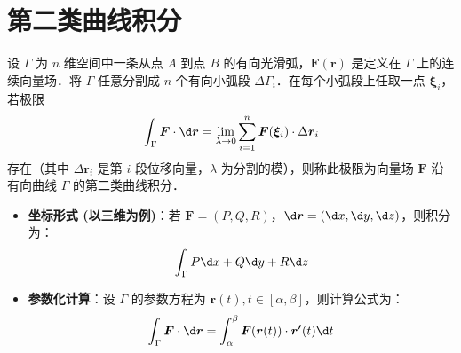 \documentclass[12pt, a4paper, oneside, UTF8]{ctexbook}
\begin{document}
\section{第二类曲线积分}
\begin{definition}[第二类曲线积分的定义]
    设 $\Gamma$ 为 $n$ 维空间中一条从点 $A$ 到点 $B$ 的有向光滑弧，$\bm{F}(\bm{r})$ 是定义在 $\Gamma$ 上的连续向量场．将 $\Gamma$ 任意分割成 $n$ 个有向小弧段 $\Delta \Gamma_i$．在每个小弧段上任取一点 $\bm{\xi}_i$，若极限
    \[ \int_\Gamma \bm{F} \cdot \d \bm{r} = \lim_{\lambda \to 0} \sum_{i = 1}^{n} \bm{F}(\bm{\xi}_i) \cdot \Delta \bm{r}_i \]
    存在（其中 $\Delta \bm{r}_i$ 是第 $i$ 段位移向量，$\lambda$ 为分割的模），则称此极限为向量场 $\bm{F}$ 沿有向曲线 $\Gamma$ 的第二类曲线积分．
\end{definition}
\begin{itemize}
    \item \textbf{坐标形式 (以三维为例)}：若 $\bm{F} = (P, Q, R)$，$\d \bm{r} = (\d x, \d y, \d z)$，则积分为：
    \[ \int_\Gamma P \d x + Q \d y + R \d z \]
    \item \textbf{参数化计算}：设 $\Gamma$ 的参数方程为 $\bm{r}(t), t \in [\alpha, \beta]$，则计算公式为：
    \[ \int_\Gamma \bm{F} \cdot \d \bm{r} = \int_{\alpha}^{\beta} \bm{F}(\bm{r}(t)) \cdot \bm{r'}(t) \d t \]
\end{itemize}
\end{document}
